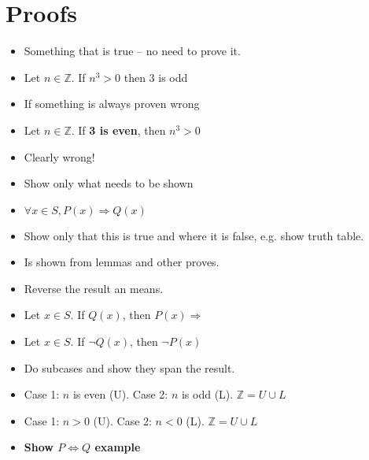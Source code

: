\documentclass[english,10pt,a4paper]{article}
\begin{document}
\newpage
\section{Proofs}


\begin{theo} 
\begin{itemize}
\item Something that is true -- no need to prove it.
\item Let $n \in \mathbb{Z}$. If $n^3 > 0$ then 3 is odd
\end{itemize}
\end{theo}



\begin{theo} 
\begin{itemize}
\item If something is always proven wrong
\item Let $n \in \mathbb{Z}$. If \textbf{3 is even}, then $n^3 > 0$
\item[] Clearly wrong!
\end{itemize}
\end{theo}



\begin{theo} 
\begin{itemize}
\item Show only what needs to be shown
\item $\forall x \in S, P(x) \Rightarrow Q(x)$
\item[] Show only that this is true and where it is false, e.g. show truth table.
\item Is shown from lemmas and other proves.
\end{itemize}
\end{theo}



\begin{theo} 
\begin{itemize}
\item Reverse the result an means.
\item Let $x \in S$. If $Q(x)$, then $P(x) \Rightarrow$
\item[] Let $x \in S$. If $\neg Q(x)$, then $\neg P(x)$
\end{itemize}
\end{theo}



\begin{theo} 
\begin{itemize}
\item Do subcases and show they span the result.
\item Case 1: $n$ is even (U). Case 2: $n$ is odd (L). $\mathbb{Z} = U \cup L $
\item Case 1: $n>0$ (U). Case 2: $n<0$ (L). $\mathbb{Z} = U \cup L$
\item \textbf{Show $P \Leftrightarrow Q$ example}
\end{itemize}
\end{theo}
\end{document}
